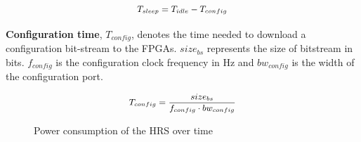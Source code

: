 \begin{equation}
\small
\begin{aligned}
T_{sleep} = T_{idle} - T_{config}
\end{aligned}
\label{eqt:sleep}
\end{equation}

\textbf{Configuration time}, $T_{config}$, denotes the time needed to download a configuration bit-stream to the FPGAs.
$size_{bs}$ represents the size of bitstream in bits.
$f_{config}$ is the configuration clock frequency in Hz and $bw_{config}$ is the width of the configuration port.

\begin{equation}
\small
\begin{aligned}
T_{config} = \frac{size_{bs}}{f_{config} \cdot bw_{config}}
\end{aligned}
\label{eqt:cf}
\end{equation}

\setcounter{subfigure}{0}
\begin{figure}[t!]
\centering
{}
\caption{Power consumption of the HRS over time}
\label{fig:timing}
\end{figure}

